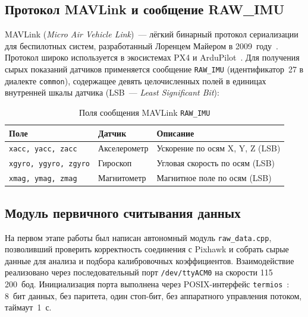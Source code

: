\documentclass[../main.tex]{subfiles}
\begin{document}
\subsection{Протокол MAVLink и сообщение RAW\_IMU}

MAVLink (\textit{Micro Air Vehicle Link})~--- лёгкий бинарный протокол
сериализации для беспилотных систем, разработанный Лоренцем Майером
в 2009~году~\cite{mavlink_docs}. Протокол широко используется в экосистемах
PX4 и ArduPilot~\cite{px4_docs}. Для получения сырых показаний датчиков
применяется сообщение \texttt{RAW\_IMU} (идентификатор~27 в диалекте
\texttt{common}), содержащее девять целочисленных полей в единицах внутренней
шкалы датчика (LSB~--- \textit{Least Significant Bit}):


\begin{table}[H]
\centering
\caption{Поля сообщения MAVLink \texttt{RAW\_IMU}}
\label{tab:rawimu}
\begin{tabularx}{\textwidth}{|>{\centering\arraybackslash}p{4.5cm}|
                               >{\centering\arraybackslash}p{3cm}|
                               >{\centering\arraybackslash}X|}
\hline
\textbf{Поле} & \textbf{Датчик} & \textbf{Описание} \\
\hline
\texttt{xacc, yacc, zacc}   & Акселерометр & Ускорение по осям X, Y, Z (LSB) \\
\hline
\texttt{xgyro, ygyro, zgyro}& Гироскоп     & Угловая скорость по осям (LSB) \\
\hline
\texttt{xmag, ymag, zmag}   & Магнитометр  & Магнитное поле по осям (LSB) \\
\hline
\end{tabularx}
\end{table}


\subsection{Модуль первичного считывания данных}	

На первом этапе работы был написан автономный модуль 
\texttt{raw\_data.cpp}, позволивший проверить
корректность соединения с Pixhawk и собрать сырые данные для анализа и
подбора калибровочных коэффициентов. Взаимодействие реализовано через
последовательный порт \texttt{/dev/ttyACM0} на скорости 115\,200~бод.
Инициализация порта выполнена через POSIX-интерфейс
\texttt{termios}~\cite{posix_termios}: 8~бит данных, без паритета, один
стоп-бит, без аппаратного управления потоком, таймаут~1~с.
 
\end{document}
